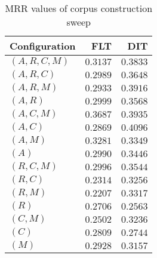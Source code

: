 
\begin{table}
\begin{spacing}{1.2}
\centering
\caption{MRR values of \openjpa corpus construction sweep}
\label{table:openjpa_corpus_sweep}
\vspace{0.2em}
\begin{tabular}{lrr}
\toprule
Configuration &           FLT &           DIT \\
\midrule
  $(A,R,C,M)$ &      $0.3137$ &      $0.3833$ \\
    $(A,R,C)$ &      $0.2989$ &      $0.3648$ \\
    $(A,R,M)$ &      $0.2933$ &      $0.3916$ \\
      $(A,R)$ &      $0.2999$ &      $0.3568$ \\
    $(A,C,M)$ & $\bm{0.3687}$ &      $0.3935$ \\
      $(A,C)$ &      $0.2869$ & $\bm{0.4096}$ \\
      $(A,M)$ &      $0.3281$ &      $0.3349$ \\
        $(A)$ &      $0.2990$ &      $0.3446$ \\
    $(R,C,M)$ &      $0.2996$ &      $0.3544$ \\
      $(R,C)$ &      $0.2314$ &      $0.3256$ \\
      $(R,M)$ &      $0.2207$ &      $0.3317$ \\
        $(R)$ &      $0.2706$ &      $0.2563$ \\
      $(C,M)$ &      $0.2502$ &      $0.3236$ \\
        $(C)$ &      $0.2809$ &      $0.2744$ \\
        $(M)$ &      $0.2928$ &      $0.3157$ \\
\bottomrule
\end{tabular}

\end{spacing}
\end{table}
